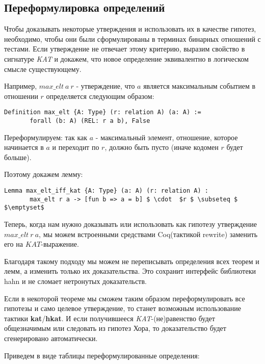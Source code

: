 \documentclass[times
              ]{itmo-student-thesis}
\begin{document}
    \subsection{Переформулировка определений}
   Чтобы доказывать некоторые утверждения и использовать их в качестве гипотез, необходимо, чтобы они были сформулированы в терминах бинарных отношений с тестами.
   Если утверждение не отвечает этому критерию, выразим свойство в сигнатуре \textit{KAT} и докажем, что новое определение эквивалентно в логическом смысле существующему.

   Например, $max\_elt\ a\ r$ - утверждение, что $a$ является максимальным событием в отношении $r$ определяется следующим образом:
   \begin{lstlisting}[mathescape=true, language=coq]
     Definition max_elt {A: Type} (r: relation A) (a: A) :=
       forall (b: A) (REL: r a b), False
   \end{lstlisting}

   Переформулируем: так как $ a $ - максимальный элемент, отношение, которое начинается в $ a $ и переходит по $ r $, должно быть пусто (иначе кодомен $ r $ будет больше).

   Поэтому докажем лемму:
   \begin{lstlisting}[mathescape=true, language=coq]
     Lemma max_elt_iff_kat {A: Type} (a: A) (r: relation A) :
       max_elt r a -> [fun b => a = b] $ \cdot  $r $ \subseteq $ $\emptyset$
   \end{lstlisting}

    Теперь, когда нам нужно доказывать или использовать как гипотезу утверждение $ max\_elt\ r\ a $,
    мы можем встроенными средствами Coq(тактикой rewrite) заменить его на $ KAT $-выражение.

    Благодаря такому подходу мы можем не переписывать определения всех теорем и лемм, а изменить только их доказательства.
    Это сохранит интерфейс библиотеки hahn и не сломает нетронутых доказательств.

    Если в некоторой теореме мы сможем таким образом переформулировать все гипотезы и само целевое утверждение, то станет возможным использование тактики \textbf{kat}/\textbf{hkat}.
    И если получившееся \textit{KAT}-(не)равенство будет общезначимым или следовать из гипотез Хора, то доказательство будет сгенерировано автоматически.

    Приведем в виде таблицы переформулированные определения:
\end{document}

